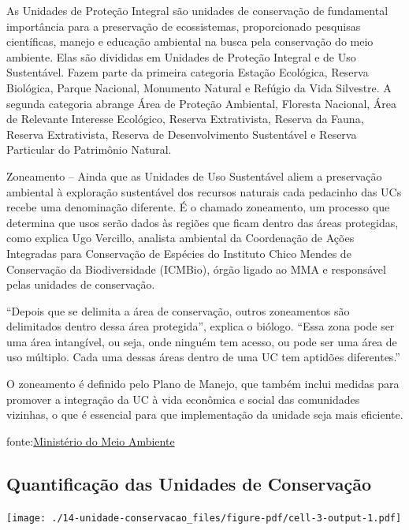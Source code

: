 \documentclass[
  letterpaper,
]{report}
\begin{document}
As Unidades de Proteção Integral são unidades de conservação de
fundamental importância para a preservação de ecossistemas,
proporcionado pesquisas científicas, manejo e educação ambiental na
busca pela conservação do meio ambiente. Elas são divididas em Unidades
de Proteção Integral e de Uso Sustentável. Fazem parte da primeira
categoria Estação Ecológica, Reserva Biológica, Parque Nacional,
Monumento Natural e Refúgio da Vida Silvestre. A segunda categoria
abrange Área de Proteção Ambiental, Floresta Nacional, Área de Relevante
Interesse Ecológico, Reserva Extrativista, Reserva da Fauna, Reserva
Extrativista, Reserva de Desenvolvimento Sustentável e Reserva
Particular do Patrimônio Natural.

Zoneamento -- Ainda que as Unidades de Uso Sustentável aliem a
preservação ambiental à exploração sustentável dos recursos naturais
cada pedacinho das UCs recebe uma denominação diferente. É o chamado
zoneamento, um processo que determina que usos serão dados às regiões
que ficam dentro das áreas protegidas, como explica Ugo Vercillo,
analista ambiental da Coordenação de Ações Integradas para Conservação
de Espécies do Instituto Chico Mendes de Conservação da Biodiversidade
(ICMBio), órgão ligado ao MMA e responsável pelas unidades de
conservação.

``Depois que se delimita a área de conservação, outros zoneamentos são
delimitados dentro dessa área protegida'', explica o biólogo. ``Essa
zona pode ser uma área intangível, ou seja, onde ninguém tem acesso, ou
pode ser uma área de uso múltiplo. Cada uma dessas áreas dentro de uma
UC tem aptidões diferentes.''

O zoneamento é definido pelo Plano de Manejo, que também inclui medidas
para promover a integração da UC à vida econômica e social das
comunidades vizinhas, o que é essencial para que implementação da
unidade seja mais eficiente.

fonte:\href{https://antigo.mma.gov.br/informma/item/15713-o-que-s\%C3\%A3o-as-unidades-de-conserva\%C3\%A7\%C3\%A3o.html}{Ministério
do Meio Ambiente}

\hypertarget{quantificauxe7uxe3o-das-unidades-de-conservauxe7uxe3o}{%
\subsection{Quantificação das Unidades de
Conservação}\label{quantificauxe7uxe3o-das-unidades-de-conservauxe7uxe3o}}

\texttt{[image: ./14-unidade-conservacao\_files/figure-pdf/cell-3-output-1.pdf]}
\end{document}
